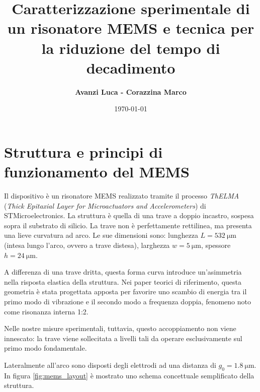 \documentclass[11pt,a4paper]{article}
\title{\textbf{Caratterizzazione sperimentale di un risonatore MEMS e tecnica per la riduzione del tempo di decadimento}}
\author{\textbf{Avanzi Luca - Corazzina Marco}}
\date{\today}
\begin{document}
\maketitle


\tableofcontents
\newpage

\section{Struttura e principi di funzionamento del MEMS}


Il dispositivo è un risonatore MEMS realizzato tramite il processo \textit{ThELMA} (\textit{Thick Epitaxial Layer for Microactuators and Accelerometers}) di STMicroelectronics. La struttura è quella di una trave a doppio incastro, sospesa sopra il substrato di silicio. La trave non è perfettamente rettilinea, ma presenta una lieve curvatura  ad arco. Le sue dimensioni sono: lunghezza $L = \SI{532}{\micro\meter}$ (intesa lungo l'arco, ovvero a trave distesa), larghezza $w = \SI{5}{\micro\meter}$, spessore $h = \SI{24}{\micro\meter}$.

A differenza di una trave dritta, questa forma curva introduce un'asimmetria nella risposta elastica della struttura. Nei paper teorici di riferimento, questa geometria è stata progettata apposta per favorire uno scambio di energia tra il primo modo di vibrazione e il secondo modo a frequenza doppia, fenomeno noto come risonanza interna 1:2.

\vspace{0.3cm}
\noindent Nelle nostre misure sperimentali, tuttavia, questo accoppiamento non viene innescato: la trave viene sollecitata a livelli tali da operare esclusivamente sul primo modo fondamentale. 

\vspace{0.3cm}
\noindent Lateralmente all'arco sono disposti degli elettrodi ad una distanza di $g_0 = \SI{1.8}{\micro\meter}$. In figura \ref{fig:mems_layout} è mostrato uno schema concettuale semplificato della struttura. 
\end{document}
